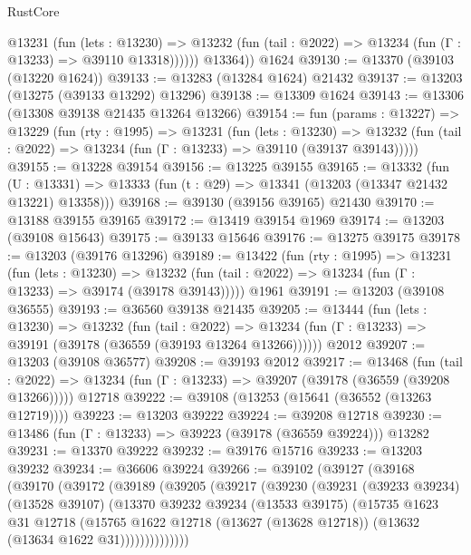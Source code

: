 \begin{lexlean}{RustCore}
\begin{coremodule}
            @13231
              (fun (lets : @13230) =>
              @13232 (fun (tail : @2022) => @13234 (fun (Γ : @13233) => @39110 @13318))))))
        @13364))
    @1624
@39130 := @13370 (@39103 (@13220 @1624))
@39133 := @13283 (@13284 @1624) @21432
@39137 := @13203 (@13275 (@39133 @13292) @13296)
@39138 := @13309 @1624
@39143 := @13306 (@13308 @39138 @21435 @13264 @13266)
@39154 := fun (params : @13227) =>
  @13229
    (fun (rty : @1995) =>
    @13231
      (fun (lets : @13230) =>
      @13232 (fun (tail : @2022) => @13234 (fun (Γ : @13233) => @39110 (@39137 @39143)))))
@39155 := @13228 @39154
@39156 := @13225 @39155
@39165 := @13332
    (fun (U : @13331) => @13333 (fun (t : @29) => @13341 (@13203 (@13347 @21432 @13221) @13358)))
@39168 := @39130 (@39156 @39165) @21430
@39170 := @13188 @39155 @39165
@39172 := @13419 @39154 @1969
@39174 := @13203 (@39108 @15643)
@39175 := @39133 @15646
@39176 := @13275 @39175
@39178 := @13203 (@39176 @13296)
@39189 := @13422
    (fun (rty : @1995) =>
    @13231
      (fun (lets : @13230) =>
      @13232 (fun (tail : @2022) => @13234 (fun (Γ : @13233) => @39174 (@39178 @39143)))))
    @1961
@39191 := @13203 (@39108 @36555)
@39193 := @36560 @39138 @21435
@39205 := @13444
    (fun (lets : @13230) =>
    @13232
      (fun (tail : @2022) =>
      @13234 (fun (Γ : @13233) => @39191 (@39178 (@36559 (@39193 @13264 @13266))))))
    @2012
@39207 := @13203 (@39108 @36577)
@39208 := @39193 @2012
@39217 := @13468
    (fun (tail : @2022) => @13234 (fun (Γ : @13233) => @39207 (@39178 (@36559 (@39208 @13266)))))
    @12718
@39222 := @39108 (@13253 (@15641 (@36552 (@13263 @12719))))
@39223 := @13203 @39222
@39224 := @39208 @12718
@39230 := @13486 (fun (Γ : @13233) => @39223 (@39178 (@36559 @39224))) @13282
@39231 := @13370 @39222
@39232 := @39176 @15716
@39233 := @13203 @39232
@39234 := @36606 @39224
@39266 := @39102
    (@39127
      (@39168
        (@39170
          (@39172
            (@39189
              (@39205
                (@39217
                  (@39230
                    (@39231
                      (@39233 @39234)
                      (@13528 @39107)
                      (@13370
                        @39232
                        @39234
                        (@13533 @39175)
                        (@15735
                          @1623
                          @31
                          @12718
                          (@15765
                            @1622
                            @12718
                            (@13627 (@13628 @12718))
                            (@13632 (@13634 @1622 @31))))))))))))))

\end{coremodule}
\end{lexlean}
